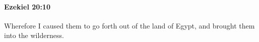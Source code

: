 
		\paragraph{Ezekiel 20:10} %
			\label{EZEKIEL-20-10}

			Wherefore I caused them to go forth out of the land of Egypt, and brought them into the wilderness.


